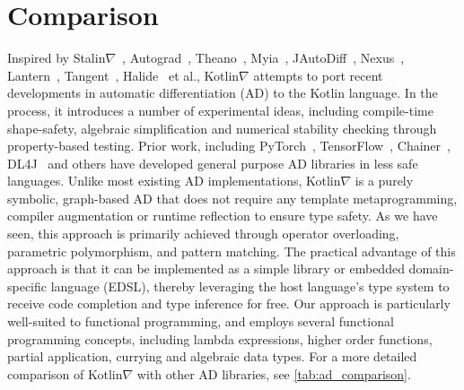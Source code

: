 \documentclass[12pt,initial,twoside,maitrise]{dms}
\numberwithin{equation}{section}
\numberwithin{table}{chapter}
\numberwithin{figure}{chapter}
\begin{document}
\section{Comparison}\label{sec:comparison}

Inspired by Stalin$\nabla$~\citep{pearlmutter2008using}, Autograd~\citep{maclaurin2015autograd}, Theano~\citep{bergstra2010theano}, Myia~\citep{breuleux2017automatic}, JAutoDiff~\citep{nureki2012jautodiff}, Nexus~\citep{chen2017typesafe}, Lantern~\citep{wang2018demystifying}, Tangent~\citep{van2018tangent}, Halide~\citep{li2018halide} et al., Kotlin$\nabla$ attempts to port recent developments in automatic differentiation (AD) to the Kotlin language. In the process, it introduces a number of experimental ideas, including compile-time shape-safety, algebraic simplification and numerical stability checking through property-based testing. Prior work, including PyTorch~\citep{paszke2017automatic}, TensorFlow~\citep{abadi2016tensorflow}, Chainer~\citep{chainer}, DL4J~\cite{team2016dl4j} and others have developed general purpose AD libraries in less safe languages. Unlike most existing AD implementations, Kotlin$\nabla$ is a purely symbolic, graph-based AD that does not require any template metaprogramming, compiler augmentation or runtime reflection to ensure type safety. As we have seen, this approach is primarily achieved through operator overloading, parametric polymorphism, and pattern matching. The practical advantage of this approach is that it can be implemented as a simple library or embedded domain-specific language (EDSL), thereby leveraging the host language's type system to receive code completion and type inference for free. Our approach is particularly well-suited to functional programming, and employs several functional programming concepts, including lambda expressions, higher order functions, partial application, currying and algebraic data types. For a more detailed comparison of Kotlin$\nabla$ with other AD libraries, see \autoref{tab:ad_comparison}.\\
\end{document}
